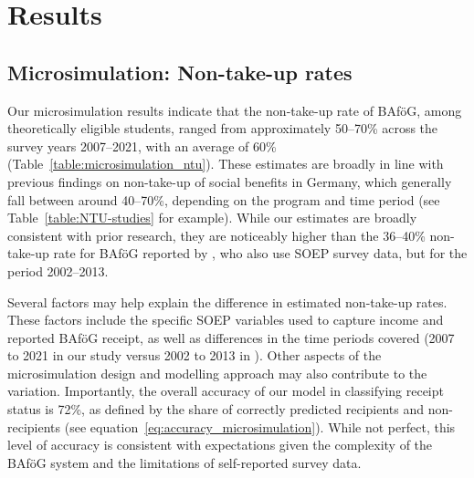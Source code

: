 %
%

\section{Results}


\subsection{Microsimulation: Non-take-up rates}

Our microsimulation results indicate that the non-take-up rate of BAföG, among theoretically eligible students, ranged from approximately 50--70\% across the survey years 2007--2021, with an average of 60\% (Table~\ref{table:microsimulation_ntu}). These estimates are broadly in line with previous findings on non-take-up of social benefits in Germany, which generally fall between around 40--70\%, depending on the program and time period (see Table~\ref{table:NTU-studies} for example). While our estimates are broadly consistent with prior research, they are noticeably higher than the 36--40\% non-take-up rate for BAföG reported by \cite{herber_non-take-up_2019}, who also use SOEP survey data, but for the period 2002--2013.

Several factors may help explain the difference in estimated non-take-up rates. These factors include the specific SOEP variables used to capture income and reported BAföG receipt, as well as differences in the time periods covered (2007 to 2021 in our study versus 2002 to 2013 in \cite{herber_non-take-up_2019}). Other aspects of the microsimulation design and modelling approach may also contribute to the variation. Importantly, the overall accuracy of our model in classifying receipt status is 72\%, as defined by the share of correctly predicted recipients and non-recipients (see equation~\ref{eq:accuracy_microsimulation}). While not perfect, this level of accuracy is consistent with expectations given the complexity of the BAföG system and the limitations of self-reported survey data.


